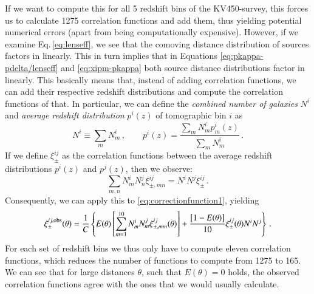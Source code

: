 If we want to compute this for all 5 redshift bins of the KV450-survey, this forces us to calculate 1275 correlation functions and add them, thus yielding potential numerical errors (apart from being computationally expensive). However, if we examine Eq.\,\eqref{eq:lenseff}, we see that the comoving distance distribution of sources factors in linearly. This in turn implies that in Equations \eqref{eq:pkappa-pdelta/lenseff} and \eqref{eq:xipm-pkappa} both source distance distributions factor in linearly. This basically means that, instead of adding correlation functions, we can add their respective redshift distributions and compute the correlation functions of that. In particular, we can define the \textit{combined number of galaxies} $N^i$ and \textit{average redshift distribution} $p^i(z)$ of tomographic bin $i$ as \[
N^i\equiv\sum_m N_m^i\, , \qquad p^i(z) = \frac{\sum_m N_m^i p_m^i(z)}{\sum_m N_m^i} \, .
\]
If we define $\xi^{ij}_\pm$ as the correlation functions between the average redshift distributions $p^i(z)$ and $p^j(z)$, then we observe: \[
\sum_{m,n}N_m^iN_n^j\xi^{ij}_{\pm,mn} = N^iN^j\xi^{ij}_\pm\, .
\]
Consequently, we can apply this to \eqref{eq:correctionfunction1}, yielding
\begin{equation}
\xi_{\pm}^{ij,\rm{obs}}(\theta) = \frac{1}{C}\left\{ E(\theta)\left[\sum_{m=1}^{10} N_m^iN_m^j \xi_{\pm,mm}^{ij}(\theta)\right] +\frac{\big[1-E(\theta)\big]}{10}\xi_\pm^{ij}(\theta)N^iN^j\right\}\, .
\label{eq:correctionfunction2}
\end{equation}
For each set of redshift bins we thus only have to compute eleven correlation functions, which reduces the number of functions to compute from 1275 to 165. We can see that for large distances $\theta$, such that $E(\theta)=0$ holds, the observed correlation functions agree with the ones that we would usually calculate.
